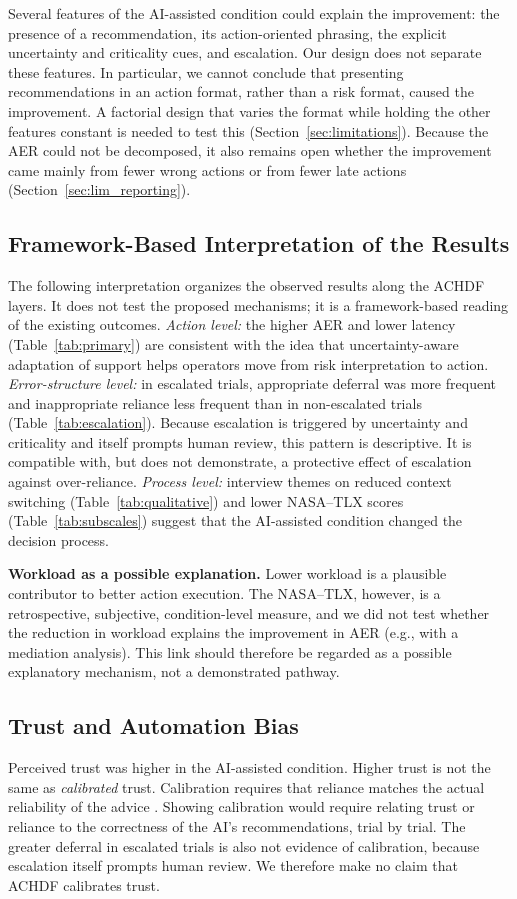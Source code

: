 \documentclass[journal]{IEEEtran}
\theoremstyle{plain}
\theoremstyle{definition}
\begin{document}
Several features of the AI-assisted condition could explain the improvement: the presence of a recommendation, its action-oriented phrasing, the explicit uncertainty and criticality cues, and escalation. Our design does not separate these features. In particular, we cannot conclude that presenting recommendations in an action format, rather than a risk format, caused the improvement. A factorial design that varies the format while holding the other features constant is needed to test this (Section~\ref{sec:limitations}). Because the AER could not be decomposed, it also remains open whether the improvement came mainly from fewer wrong actions or from fewer late actions (Section~\ref{sec:lim_reporting}).

\subsection{Framework-Based Interpretation of the Results}
\label{sec:interpretation}
The following interpretation organizes the observed results along the ACHDF layers. It does not test the proposed mechanisms; it is a framework-based reading of the existing outcomes.
\emph{Action level:} the higher AER and lower latency (Table~\ref{tab:primary}) are consistent with the idea that uncertainty-aware adaptation of support helps operators move from risk interpretation to action.
\emph{Error-structure level:} in escalated trials, appropriate deferral was more frequent and inappropriate reliance less frequent than in non-escalated trials (Table~\ref{tab:escalation}). Because escalation is triggered by uncertainty and criticality and itself prompts human review, this pattern is descriptive. It is compatible with, but does not demonstrate, a protective effect of escalation against over-reliance.
\emph{Process level:} interview themes on reduced context switching (Table~\ref{tab:qualitative}) and lower NASA--TLX scores (Table~\ref{tab:subscales}) suggest that the AI-assisted condition changed the decision process.

\textbf{Workload as a possible explanation.} Lower workload is a plausible contributor to better action execution. The NASA--TLX, however, is a retrospective, subjective, condition-level measure, and we did not test whether the reduction in workload explains the improvement in AER (e.g., with a mediation analysis). This link should therefore be regarded as a possible explanatory mechanism, not a demonstrated pathway.

\subsection{Trust and Automation Bias}
Perceived trust was higher in the AI-assisted condition. Higher trust is not the same as \emph{calibrated} trust. Calibration requires that reliance matches the actual reliability of the advice \cite{Lee2004}. Showing calibration would require relating trust or reliance to the correctness of the AI's recommendations, trial by trial. The greater deferral in escalated trials is also not evidence of calibration, because escalation itself prompts human review. We therefore make no claim that ACHDF calibrates trust.
\end{document}
